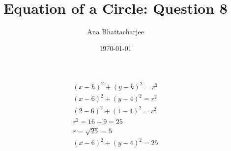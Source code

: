 \documentclass{article}
\begin{document}
\author{Ana Bhattacharjee}
\title{Equation of a Circle: Question 8}
\date{\today}
\maketitle{}
\begin{align}
  (x - h)^2 + (y-k)^2 = r^2 \\
  (x - 6)^2 + (y - 4)^2 = r^2 \\
  (2 - 6)^2 + (1 - 4)^2 = r^2 \\
  r^2 = 16 + 9 = 25 \\
  r = \sqrt{25} = 5 \\
  (x - 6)^2 + (y - 4)^2 = 25
\end{align}
\end{document}
